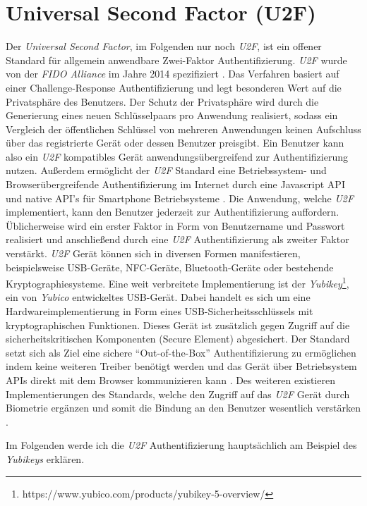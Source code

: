 \documentclass[11pt,a4paper,ngerman]{scrreprt}
\begin{document}
\section{Universal Second Factor (U2F)}
Der \textit{Universal Second Factor}, im Folgenden nur noch \textit{U2F}, ist ein offener Standard für allgemein anwendbare Zwei-Faktor Authentifizierung. \textit{U2F} wurde von der \textit{FIDO Alliance} im Jahre 2014 spezifiziert \cite{u2fv1}. Das Verfahren basiert auf einer Challenge-Response Authentifizierung und legt besonderen Wert auf die Privatsphäre des Benutzers. Der Schutz der Privatsphäre wird durch die Generierung eines neuen Schlüsselpaars pro Anwendung realisiert, sodass ein Vergleich der öffentlichen Schlüssel von mehreren Anwendungen keinen Aufschluss über das registrierte Gerät oder dessen Benutzer preisgibt. Ein Benutzer kann also ein \textit{U2F} kompatibles Gerät anwendungsübergreifend zur Authentifizierung nutzen. Außerdem ermöglicht der \textit{U2F} Standard eine Betriebssystem- und Browserübergreifende Authentifizierung im Internet durch eine Javascript API und native API's für Smartphone Betriebsysteme \cite{u2fSpec}. Die Anwendung, welche \textit{U2F} implementiert, kann den Benutzer jederzeit zur Authentifizierung auffordern. Üblicherweise wird ein erster Faktor in Form von Benutzername und Passwort realisiert und anschließend durch eine \textit{U2F} Authentifizierung als zweiter Faktor verstärkt. \textit{U2F} Gerät können sich in diversen Formen manifestieren, beispielsweise USB-Geräte, NFC-Geräte, Bluetooth-Geräte oder bestehende Kryptographiesysteme. Eine weit verbreitete Implementierung ist der \textit{Yubikey}\footnote{https://www.yubico.com/products/yubikey-5-overview/}, ein von \textit{Yubico} entwickeltes USB-Gerät. Dabei handelt es sich um eine Hardwareimplementierung in Form eines USB-Sicherheitsschlüssels mit kryptographischen Funktionen. Dieses Gerät ist zusätzlich gegen Zugriff auf die sicherheitskritischen Komponenten (Secure Element) abgesichert. Der Standard setzt sich als Ziel eine sichere ``Out-of-the-Box'' Authentifizierung zu ermöglichen indem keine weiteren Treiber benötigt werden und das Gerät über Betriebsystem APIs direkt mit dem Browser kommunizieren kann \cite{u2fSpec}. Des weiteren existieren Implementierungen des Standards, welche den Zugriff auf das \textit{U2F} Gerät durch Biometrie ergänzen und somit die Bindung an den Benutzer wesentlich verstärken \cite{eyelock}.

Im Folgenden werde ich die \textit{U2F} Authentifizierung hauptsächlich am Beispiel des \textit{Yubikeys} erklären.
\end{document}
